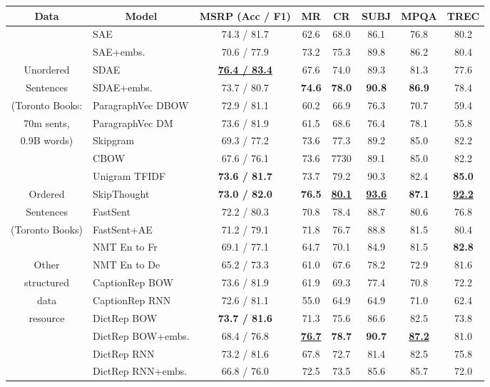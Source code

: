 \begin{table*}[ht]
\begin{adjustwidth}{-0.6cm}{}
\renewcommand{\tabcolsep}{4.6pt}
\small
\newcommand{\mc}[1]{\multicolumn{1}{l|}{#1}}
  \begin{center}

      {
        \begin{tabular}{c|l|cccccc}
           \multicolumn{1}{c}{Data} & \multicolumn{1}{|c|}{Model} & MSRP (Acc / F1) & MR & CR & SUBJ & MPQA & TREC 
          \\
          \hline
          \hline
          & SAE & 74.3 / 81.7	& 62.6	& 68.0	& 86.1	& 76.8	& 80.2 \\
          & SAE+embs. & 70.6 / 77.9	& 73.2	& 75.3	& 89.8	& 86.2	& 80.4 \\
          Unordered  & SDAE & \bf \underline{76.4 / 83.4}	& 67.6	& 74.0	& 89.3	& 81.3	& 77.6 \\
         Sentences & SDAE+embs. & 73.7 / 80.7	& \bf 74.6	&  \bf 78.0	& \bf 90.8	& \bf 86.9	& 78.4 \\
          (Toronto Books: &ParagraphVec DBOW & 72.9	/ 81.1	& 60.2	& 66.9	& 76.3	& 70.7	& 59.4 \\
        70m sents, & ParagraphVec DM & 73.6 / 81.9	& 61.5	& 68.6	& 76.4	& 78.1 & 55.8\\
         0.9B words) &Skipgram & 69.3 / 77.2	& 73.6	& 77.3	& 89.2	& 85.0	& 82.2 \\
         &CBOW & 67.6 / 76.1	& 73.6	& 7730 & 89.1	& 85.0 & 82.2 \\
           &Unigram TFIDF & \bf 73.6 /  81.7	& 73.7	& 79.2	& 90.3	& 82.4	& \bf 85.0 \\
          \hline 
             Ordered    & SkipThought & \bf 73.0 / 82.0 & \bf 76.5 & \bf  \underline{80.1}	& \bf \underline{93.6}	& \bf 87.1	& \bf \underline{92.2} \\
       Sentences &FastSent & 72.2 / 80.3	& 70.8	& 78.4	& 88.7	&80.6 & 76.8 \\
         (Toronto Books) &FastSent+AE & 71.2 / 79.1	& 71.8	& 76.7	& 88.8	& 81.5	& 80.4  \\
          \hline 
          &NMT En to Fr & 69.1 / 77.1	& 64.7	& 70.1	& 84.9	& 81.5	& \bf 82.8 \\
        Other  &NMT En to De & 65.2 / 73.3 & 61.0 & 67.6	& 78.2	& 72.9 & 81.6 \\
          structured & CaptionRep BOW & 73.6 / 81.9	& 61.9	& 69.3	& 77.4	& 70.8	& 72.2  \\
          data & CaptionRep RNN & 72.6 / 81.1 & 55.0 & 64.9 & 64.9 & 71.0 & 62.4 \\
           resource &DictRep BOW & \bf 73.7 / 81.6	& 71.3	& 75.6	& 86.6	& 82.5 & 73.8 \\
          &DictRep BOW+embs. & 68.4 / 76.8	&  \bf \underline{76.7}	& \bf 78.7	& \bf 90.7	& \bf \underline{87.2}	& 81.0  \\
           &DictRep RNN & 73.2	/ 81.6	& 67.8	& 72.7	& 81.4	& 82.5	& 75.8 \\
           &DictRep RNN+embs. & 66.8	 / 76.0 & 72.5	& 73.5	& 85.6	& 85.7 & 72.0 \\
          \hline   


\end{tabular}}
\end{center}
\end{adjustwidth}
\end{table*}
